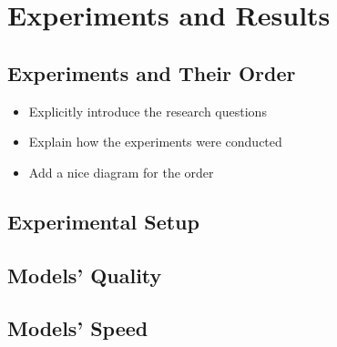 \section{Experiments and Results}
\subsection{Experiments and Their Order}
\begin{itemize}
    \item Explicitly introduce the research questions
    \item Explain how the experiments were conducted
    \item Add a nice diagram for the order
\end{itemize}
\subsection{Experimental Setup}
\subsection{Models' Quality}
\subsection{Models' Speed}
